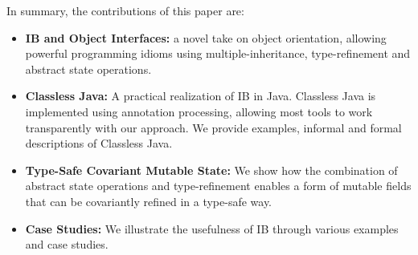 In summary, the contributions of this paper are:
\begin{itemize}

\item {\bf IB and Object Interfaces:} a novel take on object orientation, allowing
  powerful programming idioms using multiple-inheritance, 
  type-refinement and abstract state operations.

\item {\bf Classless Java:} A practical realization of IB in
  Java. Classless Java is implemented using annotation processing, 
  allowing most tools to work transparently with our approach. 
  We provide examples, informal and formal descriptions of Classless
  Java.

\item {\bf Type-Safe Covariant Mutable State:} We show how the 
 combination of abstract state operations and type-refinement enables 
 a form of mutable fields that can be covariantly refined in a type-safe way.


\item {\bf Case Studies:} We illustrate the usefulness of IB
  through various examples and case studies.


\end{itemize}
